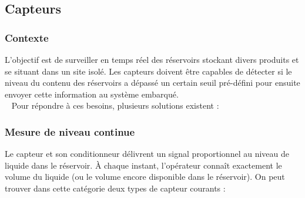 \subsection {Capteurs}

	\subsubsection {Contexte} 
	L’objectif est de surveiller en temps réel des réservoirs stockant divers produits et se situant dans un site isolé. Les capteurs doivent être capables de détecter si le niveau du contenu des réservoirs a dépassé un certain seuil pré-défini pour ensuite envoyer cette information au système embarqué. \\~
Pour répondre à ces besoins, plusieurs solutions existent : 

	\subsubsection {Mesure de niveau continue}
 	Le capteur et son conditionneur délivrent un signal proportionnel au niveau de liquide dans le réservoir. À chaque instant, l'opérateur connaît exactement le volume du liquide (ou le volume encore disponible dans le réservoir).  On peut trouver dans cette catégorie deux types de capteur  courants : 
